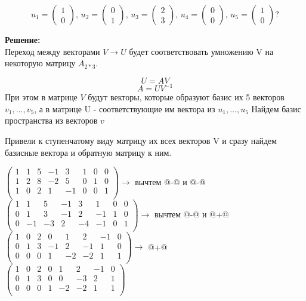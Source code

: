 \documentclass[a4paper,12pt]{article}
\makeatletter
\newcommand*{\rom}[1]{\expandafter\@slowromancap\romannumeral #1@}
\makeatother
\begin{document}
\begin{enumerate}
\[
u_1 = 
\begin{pmatrix}
{1}\\{0}
\end{pmatrix},\,
u_2 = 
\begin{pmatrix}
{0}\\{1}
\end{pmatrix},\,
u_3 = 
\begin{pmatrix}
{2}\\{3}
\end{pmatrix},\,
u_4 = 
\begin{pmatrix}
{0}\\{0}
\end{pmatrix},\,
u_5 = 
\begin{pmatrix}
{1}\\{0}
\end{pmatrix}?
\]

\vspace{5pt}

\textbf{Решение:}\\
Переход между векторами $V\rightarrow U$ будет соответствовать умножению V на некоторую матрицу $A_{2*3}$.

$$U = AV$$
$$A=UV^{-1}$$
При этом в матрице $V$ будут векторы, которые образуют базис их 5 векторов $v_1,...,v_5$, а в матрице U - соответствующие им вектора из $u_1,...,u_5$
Найдем базис пространства из векторов $v$

Привели к ступенчатому виду матрицу их всех векторов V и сразу найдем базисные вектора и обратную матрицу к ним.

$
\left(\begin{array}{ccccc|ccc}  
1&1&5&-1&3&1&0&0\\
1&2&8&-2&5&0&1&0\\
1&0&2&1&-1&0&0&1\\
\end{array}\right) \rightarrow$ вычтем \rom{2}-\rom{1} и \rom{3}-\rom{1}  \\
$
\left(\begin{array}{ccccc|ccc}  
1&1&5&-1&3&1&0&0\\
0&1&3&-1&2&-1&1&0\\
0&-1&-3&2&-4&-1&0&1\\
\end{array}\right) \rightarrow$ вычтем \rom{1}-\rom{2} и \rom{3}+\rom{2}  \\
$
\left(\begin{array}{ccccc|ccc}  
1&0&2&0&1&2&-1&0\\
0&1&3&-1&2&-1&1&0\\
0&0&0&1&-2&-2&1&1\\
\end{array}\right) \rightarrow$  \rom{2}+\rom{3}\\
$
\left(\begin{array}{ccccc|ccc}  
1&0&2&0&1&2&-1&0\\
0&1&3&0&0&-3&2&1\\
0&0&0&1&-2&-2&1&1\\
\end{array}\right)$ 



\end{enumerate}
\end{document}

